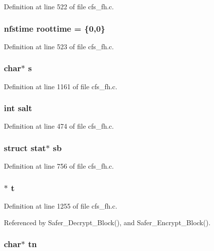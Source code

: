 Definition at line 522 of file cfs\_\-fh.c.
\subsubsection{\setlength{\rightskip}{0pt plus 5cm}nfstime {\bf roottime} = \{0,0\}}\label{cfs__fh_8c_a17}




Definition at line 523 of file cfs\_\-fh.c.
\subsubsection{\setlength{\rightskip}{0pt plus 5cm}char$\ast$ {\bf s}}\label{cfs__fh_8c_a13}




Definition at line 1161 of file cfs\_\-fh.c.
\subsubsection{\setlength{\rightskip}{0pt plus 5cm}int {\bf salt}}\label{cfs__fh_8c_a15}




Definition at line 474 of file cfs\_\-fh.c.
\subsubsection{\setlength{\rightskip}{0pt plus 5cm}struct stat$\ast$ {\bf sb}}\label{cfs__fh_8c_a25}




Definition at line 756 of file cfs\_\-fh.c.
\subsubsection{ $\ast$ {\bf t}}\label{cfs__fh_8c_a35}




Definition at line 1255 of file cfs\_\-fh.c.

Referenced by Safer\_\-Decrypt\_\-Block(), and Safer\_\-Encrypt\_\-Block().
\subsubsection{\setlength{\rightskip}{0pt plus 5cm}char$\ast$ {\bf tn}}\label{cfs__fh_8c_a37}




